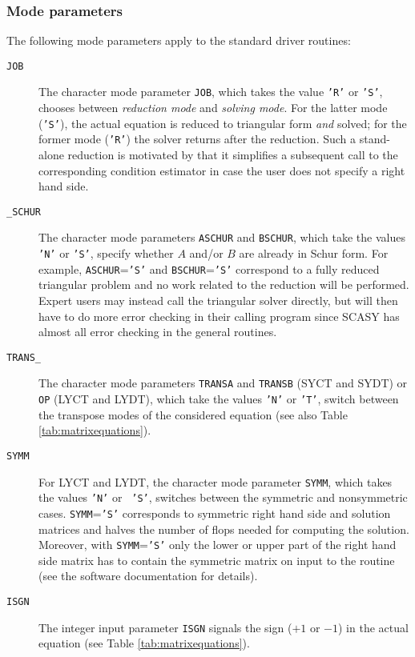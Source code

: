 \documentclass[11pt]{article}
\begin{document}
\subsubsection{Mode parameters}
The following mode parameters apply to the standard driver
routines:
\begin{description}
\item[\texttt{JOB}] The character mode parameter \texttt{JOB},
which takes the value {\tt 'R'} or {\tt 'S'}, chooses between {\em
reduction mode} and {\em solving mode}. For the latter mode ({\tt 'S'}), the
actual equation is reduced to triangular form {\em and} solved;
for the former mode ({\tt 'R'}) the solver returns after the reduction. Such a
stand-alone reduction is motivated by that it simplifies a
subsequent call to the corresponding condition estimator in case
the user does not specify a right hand side.

\item[\texttt{\_SCHUR}] The character mode parameters
\texttt{ASCHUR} and \texttt{BSCHUR}, which take the values {\tt
'N'} or {\tt 'S'}, specify whether $A$ and/or $B$ are already in
Schur form. For example, \texttt{ASCHUR}={\tt 'S'} and
\texttt{BSCHUR}={\tt 'S'} correspond to a fully reduced triangular
problem and no work related to the reduction will be performed.
Expert users may instead call the triangular solver directly, but
will then have to do more error checking in their calling program
since SCASY has almost all error checking in the general routines.

\item[\texttt{TRANS\_}] The character mode parameters
\texttt{TRANSA} and \texttt{TRANSB} (SYCT and SYDT) or \texttt{OP}
(LYCT and LYDT), which take the values {\tt 'N'} or {\tt 'T'},
switch between the transpose modes of the considered equation (see
also Table \ref{tab:matrixequations}).

\item[\texttt{SYMM}] For LYCT and LYDT, the character mode
parameter \texttt{SYMM}, which takes the values {\tt 'N'} or {\tt
'S'}, switches between the symmetric and nonsymmetric cases.
\texttt{SYMM}={\tt 'S'} corresponds to symmetric right hand side
and solution matrices and halves the number of flops needed for
computing the solution. Moreover, with \texttt{SYMM}={\tt 'S'}
only the lower or upper part of the right hand side matrix has to
contain the symmetric matrix on input to the routine (see the
software documentation for details).

\item[\texttt{ISGN}] The integer input parameter \texttt{ISGN}
signals the sign ($+1$ or $-1$) in the actual equation (see Table
\ref{tab:matrixequations}).
\end{description}
\end{document}
